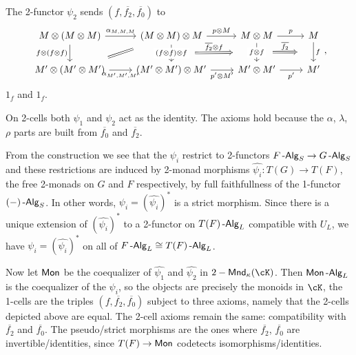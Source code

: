 \documentclass[a4paper,11pt,oneside,openany]{scrbook}
\begin{document}
\begin{exmp}
    The 2-functor $\psi_2$ sends $(f,\overline{f_2},\overline{f_0})$ to
    \[\begin{tikzcd}
        {M\otimes(M\otimes M)} & {(M\otimes M)\otimes M} & {M\otimes M} & M \\
        {M'\otimes(M'\otimes M')} & {(M'\otimes M')\otimes M'} & {M'\otimes M'} & {M'}
        \arrow["{f\otimes(f\otimes f)}"', from=1-1, to=2-1]
        \arrow[""{name=0, anchor=center, inner sep=0}, "{(f\otimes f)\otimes f}"{description}, from=1-2, to=2-2]
        \arrow[""{name=1, anchor=center, inner sep=0}, "{f\otimes f}"{description}, from=1-3, to=2-3]
        \arrow[""{name=2, anchor=center, inner sep=0}, "f", from=1-4, to=2-4]
        \arrow["{p'\otimes M'}"', from=2-2, to=2-3]
        \arrow["{p\otimes M}", from=1-2, to=1-3]
        \arrow["{p'}"', from=2-3, to=2-4]
        \arrow["p", from=1-3, to=1-4]
        \arrow["{\alpha_{M,M,M}}", from=1-1, to=1-2]
        \arrow[shorten <=14pt, shorten >=14pt, Rightarrow, no head, from=2-1, to=1-2]
        \arrow["{\alpha_{M',M',M'}}"', from=2-1, to=2-2]
        \arrow["{\overline{f_2}}", shorten <=16pt, shorten >=16pt, Rightarrow, from=1, to=2]
        \arrow["{\overline{f_2}\otimes f}", shorten <=24pt, shorten >=24pt, Rightarrow, from=0, to=1]
    \end{tikzcd},\]
    $1_f$ and $1_f$.

    On 2-cells both $\psi_1$ and $\psi_2$ act as the identity. The axioms hold
    because the $\alpha$, $\lambda$, $\rho$ parts are built from
    $\overline{f_0}$ and $\overline{f_2}$.

    From the construction we see that the $\psi_i$ restrict to 2-functors
    $F\operatorname{-\mathsf{Alg}}_S\rightarrow G\operatorname{-\mathsf{Alg}}_S$ and these restrictions are induced by 2-monad
    morphisms $\hat{\psi_i}\colon T(G)\rightarrow T(F)$, the free 2-monads on
    $G$ and $F$ respectively, by full faithfullness of the 1-functor
    $(-)\operatorname{-\mathsf{Alg}}_S$. In other words, $\psi_i=(\hat{\psi_i})^*$ is a strict morphism.
    Since there is a unique extension of $(\hat{\psi_i})^*$ to a 2-functor on
    $T(F)\operatorname{-\mathsf{Alg}}_L$ compatible with $U_L$, we have $\psi_i=(\hat{\psi_i})^*$ on all
    of $F\operatorname{-\mathsf{Alg}}_L\cong T(F)\operatorname{-\mathsf{Alg}}_L$.

    Now let $\operatorname{\mathsf{Mon}}$ be the coequalizer of $\hat{\psi_1}$ and $\hat{\psi_2}$ in
    $2-\Mnd_\kappa(\cK)$. Then $\operatorname{\mathsf{Mon}}\operatorname{-\mathsf{Alg}}_L$ is the coequalizer of the $\psi_i$,
    so the objects are precisely the monoids in $\cK$, the 1-cells are the
    triples $(f,\overline{f_2},\overline{f_0})$ subject to three axioms, namely
    that the 2-cells depicted above are equal. The 2-cell axioms remain the
    same: compatibility with $\overline{f_2}$ and $\overline{f_0}$. The
    pseudo/strict morphisms are the ones where $\overline{f_2}$,
    $\overline{f_0}$ are invertible/identities, since $T(F)\rightarrow\operatorname{\mathsf{Mon}}$
    codetects isomorphisms/identities.


\end{exmp}
\end{document}
